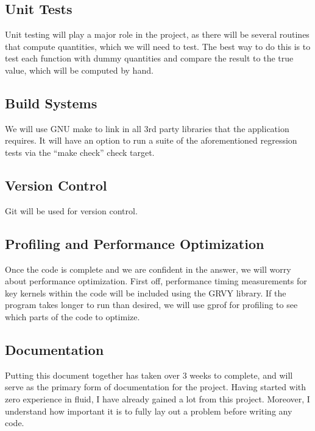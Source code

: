 \documentclass[12pt]{article}
\begin{document}
\subsection{Unit Tests}

Unit testing will play a major role in the project, as there will be several
routines that compute quantities, which we will need to test. The best way to do
this is to test each function with dummy quantities and compare the result to the
true value, which will be computed by hand. 


\subsection{Build Systems}

We will use GNU make to link in all 3rd party libraries that the application
requires. It will have an option to run a suite of the aforementioned regression
tests via the ``make check'' check target.  

\subsection{Version Control} 

Git will be used for version control. 

\subsection{Profiling and Performance Optimization} 
Once the code is complete and we are confident in the answer, we will worry
about performance optimization. First off, performance timing
measurements for key kernels within the code will be included using the GRVY
library. If the program takes longer to run than desired, we will use gprof for
profiling to see which parts of the code to optimize.    

\subsection{Documentation}

Putting this document together has taken over 3 weeks to complete, and will
serve as the primary form of documentation for the project. Having started with
zero experience in fluid, I have already gained a lot from this project.
Moreover, I understand how important it is to fully lay out a problem before
writing any code. 












\newpage 
{}


\end{document}
